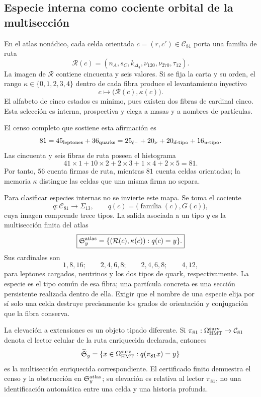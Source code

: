 \subsection{Especie interna como cociente orbital de la multisección}

En el atlas non\'adico, cada celda orientada \(c=(r,c')\in\mathcal C_{81}\)
porta una familia de ruta
\[
 \mathcal R(c)=
 (n_A,s_C,k_{\Delta_4},\nu_{120},\nu_{270},\tau_{12}).
\]
La imagen de \(\mathcal R\) contiene cincuenta y seis valores. Si se fija la
carta y su orden, el rango \(\kappa\in\{0,1,2,3,4\}\) dentro de cada fibra
produce el levantamiento inyectivo
\[
 c\longmapsto \bigl(\mathcal R(c),\kappa(c)\bigr).
\]
El alfabeto de cinco estados es m\'inimo, pues existen dos fibras de
cardinal cinco. Esta selecci\'on es interna, prospectiva y ciega a masas y a
nombres de part\'iculas.

El censo completo que sostiene esta afirmaci\'on es
\[
 81=45_{\rm leptones}+36_{\rm quarks}
   =25_{\ell^-}+20_{\nu}+20_{d\text{-tipo}}+16_{u\text{-tipo}}.
\]
Las cincuenta y seis fibras de ruta poseen el histograma
\[
 41\times1+10\times2+2\times3+1\times4+2\times5=81.
\]
Por tanto, \(56\) cuenta firmas de ruta, mientras \(81\) cuenta celdas
orientadas; la memoria \(\kappa\) distingue las celdas que una misma firma no
separa.

Para clasificar especies internas no se invierte este mapa. Se toma el
cociente
\[
 q:\mathcal C_{81}\longrightarrow\Sigma_{13},
 \qquad
 q(c)=\bigl(\operatorname{familia}(c),G(c)\bigr),
\]
cuya imagen comprende trece tipos. La salida asociada a un tipo \(y\) es la
multisecci\'on finita del atlas
\[
 \boxed{
 \mathfrak S_y^{\rm atlas}=
 \{(\mathcal R(c),\kappa(c)):q(c)=y\}.}
\]
Sus cardinales son
\[
 1,8,16;\qquad 2,4,6,8;\qquad 2,4,6,8;\qquad4,12,
\]
para leptones cargados, neutrinos y los dos tipos de quark,
respectivamente. La especie es el tipo com\'un de esa fibra; una part\'icula
concreta es una secci\'on persistente realizada dentro de ella. Exigir que el
nombre de una especie elija por s\'i solo una celda destruye precisamente los
grados de orientaci\'on y conjugaci\'on que la fibra conserva.

La elevaci\'on a extensiones es un objeto tipado diferente. Si
\(\pi_{81}:\Omega_{\rm HMT}^{\rm surv}\to\mathcal C_{81}\) denota el lector
celular de la ruta enriquecida declarada, entonces
\[
 \widetilde{\mathfrak S}_y
 =\{x\in\Omega_{\rm HMT}^{\rm surv}:q(\pi_{81}x)=y\}
\]
es la multisecci\'on enriquecida correspondiente. El certificado finito
demuestra el censo y la obstrucci\'on en
\(\mathfrak S_y^{\rm atlas}\); su elevaci\'on es relativa al lector
\(\pi_{81}\), no una identificaci\'on autom\'atica entre una celda y una
historia profunda.

